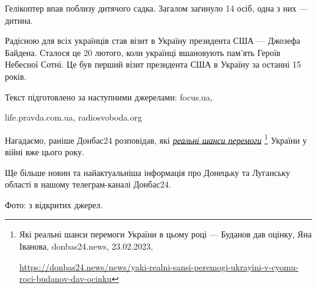 Гелікоптер впав поблизу дитячого садка. Загалом загинуло 14 осіб, одна з них —
дитина.

Радісною для всіх українців став візит в Україну президента США — Джозефа
Байдена. Сталося це 20 лютого, коли українці вшановують пам'ять Героїв Небесної
Сотні. Це був перший візит президента США в Україну за останні 15 років.


Текст підготовлено за наступними джерелами: focus.ua,\par\noindent life.pravda.com.ua,
radiosvoboda.org

Нагадаємо, раніше Донбас24 розповідав, які \href{https://donbas24.news/news/yaki-realni-sansi-peremogi-ukrayini-v-cyomu-roci-budanov-dav-ocinku}{\emph{реальні шанси перемоги}}%
\footnote{Які реальні шанси перемоги України в цьому році — Буданов дав оцінку, Яна Іванова, donbas24.news, 23.02.2023, \par\url{https://donbas24.news/news/yaki-realni-sansi-peremogi-ukrayini-v-cyomu-roci-budanov-dav-ocinku}}
України у війні вже цього року.

Ще більше новин та найактуальніша інформація про Донецьку та Луганську області
в нашому телеграм-каналі Донбас24.

Фото: з відкритих джерел.

